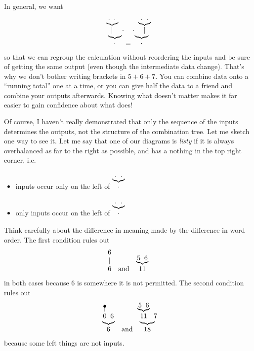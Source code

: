 \documentclass{book}
\begin{document}
In general, we want
\[
\wye{\wye\cdot\cdot\mid}\cdot\cdot \;=\; \wye\cdot{\wye\cdot\cdot\mid}\cdot
\]
so that we can regroup the calculation without reordering the inputs and be sure of getting the same output (even though the intermediate data change). That's why we don't bother writing brackets in $5+6+7$. You can combine data onto a ``running total'' one at a time, or you can give half the data to a friend and combine your outputs afterwards. Knowing what doesn't matter makes it far easier to gain confidence about what does!

Of course, I haven't really demonstrated that only the sequence of the inputs determines the outputs, not the structure of the combination tree. Let me sketch one way to see it. Let me say that one of our diagrams is \emph{listy} if it is always overbalanced as far to the right as possible, and has a nothing in the top right corner, i.e.
\begin{itemize}
\item inputs occur only on the left of $\wye\cdot\cdot\cdot$
\item only inputs occur on the left of $\wye\cdot\cdot\cdot$
\end{itemize}
Think carefully about the difference in meaning made by the difference in word order. The first condition rules out
\[
\wid 6 \quad\mbox{and}\quad \wye56{11}
\]
in both cases because $6$ is somewhere it is not permitted.
The second condition rules out
\[
\wye{\naw0}66 \quad\mbox{and}\quad \wye{\wye56{11}}7{18}
\]
because some left things are not inputs.
\end{document}
